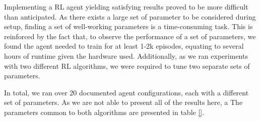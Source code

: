 Implementing a RL agent yielding satisfying results proved to be more difficult than anticipated.
As there exists a large set of parameter to be considered during setup, finding a set of well-working parameters is a time-consuming task.
This is reinforced by the fact that, to observe the performance of a set of parameters, we found the agent needed to train for at least 1-2k episodes, equating to several hours of runtime given the hardware used.
Additionally, as we ran experiments with two different RL algorithms, we were required to tune two separate sets of parameters.

In total, we ran over 20 documented agent configurations, each with a different set of parameters.
As we are not able to present all of the results here, a 
The parameters common to both algorithms are presented in table \ref{}.

